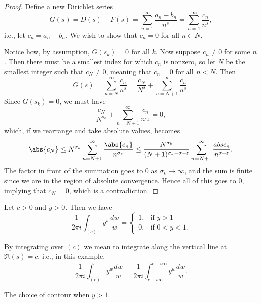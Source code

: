 \begin{proof}
	Define a new Dirichlet series
	\[
		G(s) = D(s) - F(s) = \sum_{n = 1}^\infty \frac{a_n - b_n}{n^s} = \sum_{n = 1}^\infty \frac{c_n}{n^s},
	\]
	i.e., let $c_n = a_n - b_n$.
	We wish to show that $c_n = 0$ for all $n \in N$.

	Notice how, by assumption, $G(s_k) = 0$ for all $k$.
	Now suppose $c_n \neq 0$ for some $n$.
	Then there must be a smallest index for which $c_n$ is nonzero, so let $N$ be the smallest integer such that $c_N \neq 0$, meaning that $c_n = 0$ for all $n < N$.
	Then
	\[
		G(s) = \sum_{n = N}^\infty \frac{c_n}{n^s} = \frac{c_N}{N^s} + \sum_{n = N + 1}^\infty \frac{c_n}{n^s}.
	\]
	Since $G(s_k) = 0$, we must have
	\[
		\frac{c_N}{N^{s_k}} + \sum_{n = N + 1}^\infty \frac{c_n}{n^{s_k}} = 0,
	\]
	which, if we rearrange and take absolute values, becomes
	\[
		\abs{c_N} \leq N^{\sigma_k} \sum_{n = N + 1}^\infty \frac{\abs{c_n}}{n^{\sigma_k}} \leq \frac{N^{\sigma_k}}{(N + 1)^{\sigma_k - \sigma - \varepsilon}} \sum_{n = N + 1}^\infty \frac{abs{c_n}}{n^{\sigma + \varepsilon}}.
	\]
	The factor in front of the summation goes to $0$ as $\sigma_k \to \infty$, and the sum is finite since we are in the region of absolute convergence.
	Hence all of this goes to $0$, implying that $c_N = 0$, which is a contradiction.
\end{proof}


\begin{lemma}\label{lem12.5}
	Let $c > 0$ and $y > 0$.
	Then we have
	\[
		\frac{1}{2 \pi i} \int_{(c)} y^w \frac{d w}{w} = \begin{cases}
			1, & \text{if $y > 1$} \\
			0, & \text{if $0 < y < 1$}.
		\end{cases}
	\]
\end{lemma}

\begin{remark}
	By integrating over $(c)$ we mean to integrate along the vertical line at $\Re(s) = c$, i.e., in this example,
	\[
		\frac{1}{2 \pi i} \int_{(c)} y^w \frac{d w}{w} = \frac{1}{2 \pi i} \int_{c - i \infty}^{c + i \infty} y^w \frac{d w}{w}.
	\]
\end{remark}

\begin{marginfigure}

	\caption{\label{l30:lem125a} The choice of contour when $y > 1$.}
\end{marginfigure}

